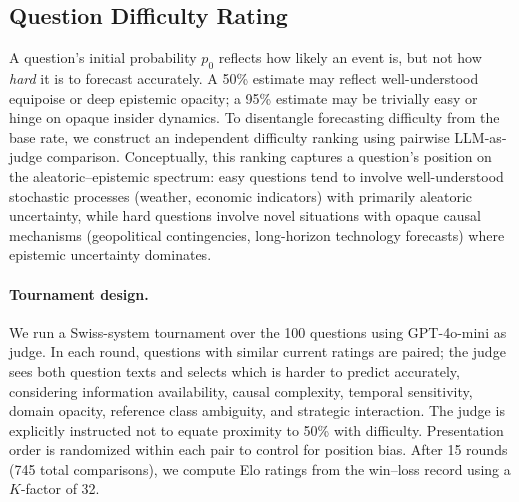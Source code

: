 \documentclass[11pt]{article}
\begin{document}
\subsection{Question Difficulty Rating}
\label{app:difficulty}

A question's initial probability $p_0$ reflects how likely an event is, but not how \emph{hard} it is to forecast accurately.
A 50\% estimate may reflect well-understood equipoise or deep epistemic opacity; a 95\% estimate may be trivially easy or hinge on opaque insider dynamics.
To disentangle forecasting difficulty from the base rate, we construct an independent difficulty ranking using pairwise LLM-as-judge comparison.
Conceptually, this ranking captures a question's position on the aleatoric--epistemic spectrum: easy questions tend to involve well-understood stochastic processes (weather, economic indicators) with primarily aleatoric uncertainty, while hard questions involve novel situations with opaque causal mechanisms (geopolitical contingencies, long-horizon technology forecasts) where epistemic uncertainty dominates.

\paragraph{Tournament design.}
We run a Swiss-system tournament over the 100 questions using GPT-4o-mini as judge.
In each round, questions with similar current ratings are paired; the judge sees both question texts and selects which is harder to predict accurately, considering information availability, causal complexity, temporal sensitivity, domain opacity, reference class ambiguity, and strategic interaction.
The judge is explicitly instructed not to equate proximity to 50\% with difficulty.
Presentation order is randomized within each pair to control for position bias.
After 15 rounds (745 total comparisons), we compute Elo ratings from the win--loss record using a $K$-factor of 32.
\end{document}
